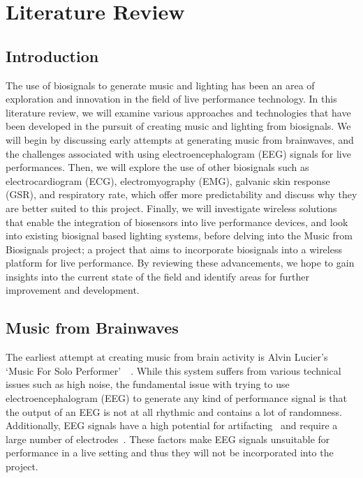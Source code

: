 \section{Literature Review}
\subsection{Introduction}
The use of biosignals to generate music and lighting has been an area of exploration and innovation in the field of live performance technology.
In this literature review, we will examine various approaches and technologies that have been developed in the pursuit of creating music and lighting from biosignals.
We will begin by discussing early attempts at generating music from brainwaves,
and the challenges associated with using electroencephalogram (EEG) signals for live performances.
Then, we will explore the use of other biosignals such as electrocardiogram (ECG), electromyography (EMG), galvanic skin response (GSR), and respiratory rate,
which offer more predictability and discuss why they are better suited to this project.
Finally, we will investigate wireless solutions that enable the integration of biosensors into live performance devices,
and look into existing biosignal based lighting systems, before delving into the Music from Biosignals project;
a project that aims to incorporate biosignals into a wireless platform for live performance.
By reviewing these advancements, we hope to gain insights into the current state of the field and identify areas for further improvement and development.


\subsection{Music from Brainwaves}
The earliest attempt at creating music from brain activity is Alvin Lucier's `Music For Solo Performer'~\cite{Lucier:2010}~\cite{Straebel:2014}.
While this system suffers from various technical issues such as high noise,
the fundamental issue with trying to use electroencephalogram (EEG) to generate any kind of performance signal
is that the output of an EEG is not at all rhythmic and contains a lot of randomness.
Additionally, EEG signals have a high potential for artifacting~\cite{Mannan:2018} and require a large number of electrodes~\cite{Piorecky:2019}.
These factors make EEG signals unsuitable for performance in a live setting and thus they will not be incorporated into the project.

